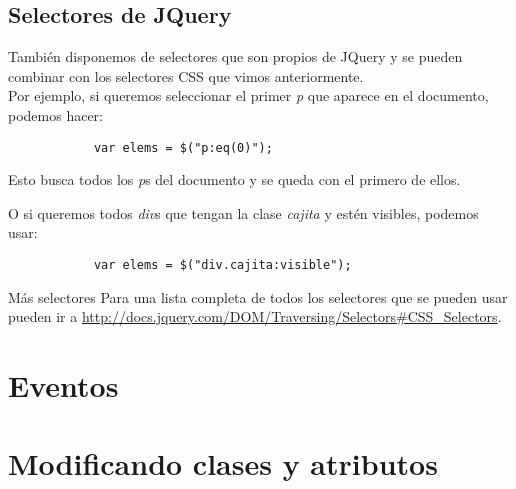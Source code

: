 \documentclass[10pt]{beamer}
\begin{document}
\subsection{Selectores de JQuery}
\begin{frame}[fragile]
	\pause También disponemos de selectores que son propios de JQuery y se pueden combinar con los selectores
			 CSS que vimos anteriormente. \\
	
	\pause Por ejemplo, si queremos seleccionar el primer \emph{p} que aparece en el documento, podemos hacer:
	
	\pause \begin{lstlisting}
			var elems = $("p:eq(0)");
		\end{lstlisting}
	
	\pause Esto busca todos los \emph{p}s del documento y se queda con el primero de ellos.
	
	\pause O si queremos todos \emph{div}s que tengan la clase \emph{cajita} y estén visibles, 
			 podemos usar:
	 
	\pause \begin{lstlisting}
			var elems = $("div.cajita:visible");
		\end{lstlisting}
		
	\pause \begin{block}{Más selectores}
			Para una lista completa de todos los selectores que se pueden usar pueden ir a \url{http://docs.jquery.com/DOM/Traversing/Selectors#CSS_Selectors}.
		\end{block}
\end{frame}

\section{Eventos}
\begin{frame}
	\pause 
\end{frame}


\section{Modificando clases y atributos}
\end{document}
